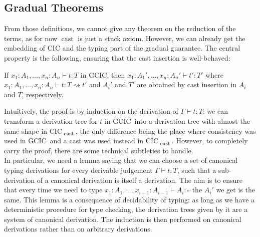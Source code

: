 \documentclass[en]{myarticle}
\renewcommand{\mathtt}{\mathrm}
\newcommand{\uni}[1][]{\square_{#1}}
\newcommand{\comp}{\rightsquigarrow}
\DeclareMathOperator{\?}{?}
\newcommand{\cas}{\operatorname{\mathtt{cast}}}
\newcommand{\gcic}{GCIC}
\newcommand{\cacic}{CIC\textsubscript{$\cas$}}
\begin{document}
{\subsection{Gradual Theorems}


From those definitions, we cannot give any theorem on the reduction of the terms, as for now $\cas$ is just a stuck axiom. However, we can already get the embedding of CIC and the typing part of the gradual guarantee. The central property is the following, ensuring that the cast insertion is well-behaved:
\begin{prop}
If $x_1 : A_1, \dots, x_n : A_n \vdash t : T$ in \gcic, then $x_1 : A_1', \dots, x_n : A_n' \vdash t' : T'$ where $x_1 : A_1, \dots, x_n : A_n \vdash t : T \comp t'$ and $A_i'$ and $T'$ are obtained by cast insertion in $A_i$ and $T$, respectively.
\end{prop}

\begin{dem}[Sketch]
	Intuitively, the proof is by induction on the derivation of $\Gamma \vdash t : T$: we can transform a derivation tree for $t$ in \gcic\ into a derivation tree with almost the same shape in \cacic, the only difference being the place where consistency was used in \gcic\ and a cast was used instead in \cacic. However, to completely carry the proof, there are some technical subtleties to handle.\\
	In particular, we need a lemma saying that we can choose a set of canonical typing derivations for every derivable judgement $\Gamma \vdash t : T$, such that a sub-derivation of a canonical derivation is itself a derivation. The aim is to ensure that every time we need to type $x_1 : A_1, \dots, x_{i-1} : A_{i-1} \vdash A_i : \uni$ the $A_i'$ we get is the same. This lemma is a consequence of decidability of typing: as long as we have a deterministic procedure for type checking, the derivation trees given by it are a system of canonical derivation. The induction is then performed on canonical derivations rather than on arbitrary derivations.
\end{dem}

}
\end{document}
